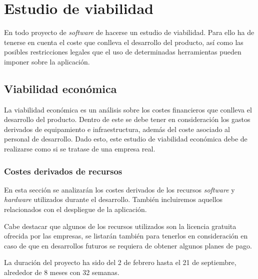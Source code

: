 \newpage
\section{Estudio de viabilidad}

En todo proyecto de \textit{software} de hacerse un estudio de viabilidad. Para ello ha de tenerse en cuenta el coste que conlleva el desarrollo del producto, así como las posibles restricciones legales que el uso de determinadas herramientas pueden imponer sobre la aplicación.
\subsection{Viabilidad económica}
La viabilidad económica es un análisis sobre los costes financieros que conlleva el desarrollo del producto. Dentro de este se debe tener en consideración los gastos derivados de equipamiento e infraestructura, además del coste asociado al personal de desarrollo. Dado esto, este estudio de viabilidad económica debe de realizarse como si se tratase de una empresa real.

\subsubsection{Costes derivados de recursos}
En esta sección se analizarán los costes derivados de los recursos \textit{software} y \textit{hardware} utilizados durante el desarrollo. También incluiremos aquellos relacionados con el despliegue de la aplicación.

Cabe destacar que algunos de los recursos utilizados son la licencia gratuita ofrecida por las empresas, se listarán también para tenerlos en consideración en caso de que en desarrollos futuros se requiera de obtener algunos planes de pago.

La duración del proyecto ha sido del 2 de febrero hasta el 21 de septiembre, alrededor de 8 meses con 32 semanas. 

